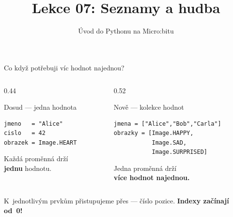 

\title{Lekce 07: Seznamy a hudba}
\subtitle{Úvod do Pythonu na Micro:bitu}
\date{}



\begin{frame}
  \titlepage
\end{frame}

\begin{frame}[fragile]{Co když potřebuji víc hodnot najednou?}

  \begin{columns}[T]
    \begin{column}{0.44\textwidth}
      \begin{block}{Dosud — jedna hodnota}
        \begin{lstlisting}
jmeno   = "Alice"
cislo   = 42
obrazek = Image.HEART
        \end{lstlisting}
        \small Každá proměnná drží\\
        \textbf{jednu} hodnotu.
      \end{block}
    \end{column}
    \begin{column}{0.52\textwidth}
      \begin{exampleblock}{Nově — kolekce hodnot}
        \begin{lstlisting}
jmena = ["Alice","Bob","Carla"]
obrazky = [Image.HAPPY,
           Image.SAD,
           Image.SURPRISED]
        \end{lstlisting}
        \small Jedna proměnná drží\\
        \textbf{více hodnot najednou.}
      \end{exampleblock}
    \end{column}
  \end{columns}

  \pause\bigskip
  \begin{center}
  \end{center}

  \pause\medskip
  K~jednotlivým prvkům přistupujeme přes  — číslo pozice.
  \textbf{Indexy začínají od~0!}
\end{frame}

